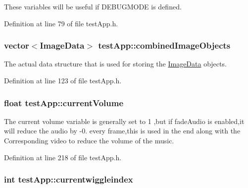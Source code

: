 These variables will be useful if D\-E\-B\-U\-G\-M\-O\-D\-E is defined. 



Definition at line 79 of file test\-App.\-h.

\hypertarget{classtest_app_aced9b8a8419c8465877c2c9cd43f8934}{
\subsubsection[{combined\-Image\-Objects}]{\setlength{\rightskip}{0pt plus 5cm}vector$<${\bf Image\-Data}$>$ test\-App\-::combined\-Image\-Objects}}\label{classtest_app_aced9b8a8419c8465877c2c9cd43f8934}


The actual data structure that is used for storing the \hyperlink{struct_image_data}{Image\-Data} objects. 



Definition at line 123 of file test\-App.\-h.

\hypertarget{classtest_app_a51c20c5432d9f6b06f719526d9a34ee6}{
\subsubsection[{current\-Volume}]{\setlength{\rightskip}{0pt plus 5cm}float test\-App\-::current\-Volume}}\label{classtest_app_a51c20c5432d9f6b06f719526d9a34ee6}


The current volume variable is generally set to 1 ,but if fade\-Audio is enabled,it will reduce the audio by -\/0. every frame,this is used in the end along with the Corresponding video to reduce the volume of the music. 



Definition at line 218 of file test\-App.\-h.

\hypertarget{classtest_app_a6b9af0b1ae4a2c0530eb6a8cf8340751}{
\subsubsection[{currentwiggleindex}]{\setlength{\rightskip}{0pt plus 5cm}int test\-App\-::currentwiggleindex}}\label{classtest_app_a6b9af0b1ae4a2c0530eb6a8cf8340751}


